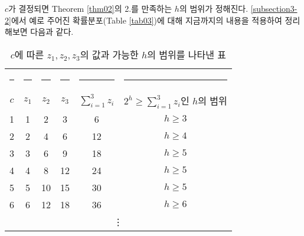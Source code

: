 \documentclass[11pt]{article}
\begin{document}
$c$가 결정되면 Theorem \ref{thm02}의 2.를 만족하는 $h$의 범위가 정해진다. \ref{subsection3-2}에서 예로 주어진 확률분포(Table \ref{tab03})에 대해 지금까지의 내용을 적용하여 정리해보면 다음과 같다.
\\
\begin{table}[h]
\centering
\begin{tabular}{cccccc}
\toprule
\rule{1cm}{0pt} & \rule{0.6cm}{0pt} & \rule{0.6cm}{0pt} & \rule{0.6cm}{0pt} & \rule{1.2cm}{0pt} & \rule{3cm}{0pt} \\[-\arraystretch\normalbaselineskip]
$c$ & $z_{1}$ & $z_{2}$ & $z_{3}$ & $\displaystyle \sum_{i=1}^{3}z_{i}$ & $2^{h} \ge \displaystyle \sum_{i=1}^{3}z_{i}$인 $h$의 범위 \\
\midrule
1 & 1 & 2 & 3 & 6 & $h \ge 3$\\
2 & 2 & 4 & 6 & 12 & $h \ge 4$\\
3 & 3 & 6 & 9 & 18 & $h \ge 5$\\
4 & 4 & 8 & 12 & 24 & $h \ge 5$\\
5 & 5 & 10 & 15 & 30 & $h \ge 5$\\
6 & 6 & 12 & 18 & 36 & $h \ge 6$\\
\multicolumn{6}{c}{\vdots}\\
\bottomrule
\end{tabular}
\caption{$c$에 따른 $z_{1}, z_{2}, z_{3}$의 값과 가능한 $h$의 범위를 나타낸 표}
\label{tab05}
\end{table}
\end{document}
